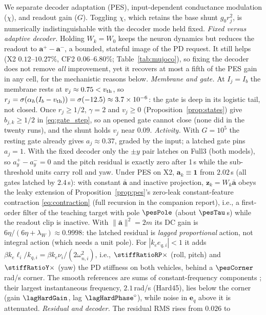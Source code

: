 \documentclass[letterpaper, 10 pt, conference]{ieeeconf}
\begin{document}
We separate decoder adaptation (PES), input-dependent conductance
modulation ($\chi$), and readout gain ($G$). Toggling $\chi$, which
retains the base shunt $g_0r_j^2$, is numerically indistinguishable with
the decoder mode held fixed. \emph{Fixed versus adaptive decoder.} Holding $W_k=W_0$ keeps the neuron
dynamics but reduces the readout to $\bm a^+-\bm a^-$, a bounded, stateful
image of the PD request. It still helps (X2 $0.12$--$10.27\%$, CF2
$0.06$--$6.80\%$; Table~\ref{tab:mujoco}), so fixing the decoder does not
remove \emph{all} improvement, yet it recovers at most a fifth of the PES
gain in any cell, for the mechanistic reasons below.
\emph{Membrane and gate.} At $I_j=I_b$ the membrane rests at
$v_j\approx0.75<v_{\rm th}$, so
$r_j=\sigma(\alpha_h(I_b-v_{\rm th}))=\sigma(-12.5)\approx3.7\times10^{-6}$:
the gate is deep in its logistic tail, not closed. Once $r_j\ge1/2$,
$\gamma=2$ and $v_j\ge0$ (Proposition~\ref{prop:states}) give
$b_{j,k}\ge1/2$ in \eqref{eq:gate_step}, so an opened gate cannot close
(none did in the twenty runs), and the shunt holds $v_j$ near $0.09$.
\emph{Activity.} With $G=10^5$ the resting gate already gives
$a_j\approx0.37$, graded by the input; a latched gate pins $a_j=1$. With
the fixed decoder only the $\pm y$ pair latches on Full3 (both models), so
$a^+_y-a^-_y=0$ and the pitch residual is exactly zero after 1\,s while
the sub-threshold units carry roll and yaw. Under PES on X2,
$\bm a_k\equiv\bm1$ from $2.02$\,s (all gates latched by $2.4$\,s): with
constant $\bar{\bm a}$ and inactive projection, $\bm z_k=W_k\bar{\bm a}$
obeys the leaky extension of Proposition~\ref{prop:pes}'s zero-leak
constant-feature contraction \eqref{eq:contraction} (full recursion in the
companion report), i.e., a first-order filter of the teaching target with
pole $\pesPole$ (about $\pesTau$\,s) while the readout clip is inactive.
With $\|\bar{\bm a}\|^2=2m$ its DC gain is
$6\eta/(6\eta+\lambda_W)\approx0.9998$:
the latched residual is \emph{lagged proportional} action, not integral
action (which needs a unit pole). For $|k_ee_{q,i}|<1$ it adds
$\beta k_e\ell_i/k_{q,i}=\beta k_e\nu_i/(2\omega_{n,i}^2)$, i.e.,
$\stiffRatioRP\times$ (roll, pitch) and $\stiffRatioY\times$ (yaw) the PD
stiffness on both vehicles, behind a $\pesCorner$\,rad/s corner. The smooth
references are sums of constant-frequency components
\cite{sandoval2018instantaneous}; their largest instantaneous frequency,
$2.1$\,rad/s (Hard45), lies below the corner (gain $\lagHardGain$, lag
$\lagHardPhase^\circ$), while noise in $\bm e_q$ above it is attenuated.
\emph{Residual and decoder.} The residual RMS rises from $0.026$ to
\end{document}
